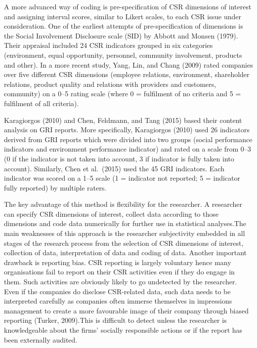 \documentclass[
]{mitthesis}
\begin{document}
A more advanced way of coding is pre-specification of CSR dimensions of interest and assigning interval scores, similar to Likert scales, to each CSR issue under consideration. One of the earliest attempts of pre-specification of dimensions is the Social Involvement Disclosure scale (SID) by Abbott and Monsen (1979). Their appraisal included 24 CSR indicators grouped in six categories (environment, equal opportunity, personnel, community involvement, products and other). In a more recent study, Yang, Lin, and Chang (2009) rated companies over five different CSR dimensions (employee relations, environment, shareholder relations, product quality and relations with providers and customers, community) on a 0--5 rating scale (where 0 = fulfilment of no criteria and 5 = fulfilment of all criteria).

Karagiorgos (2010) and Chen, Feldmann, and Tang (2015) based their content analysis on GRI reports. More specifically, Karagiorgos (2010) used 26 indicators derived from GRI reports which were divided into two groups (social performance indicators and environment performance indicator) and rated on a scale from 0--3 (0 if the indicator is not taken into account, 3 if indicator is fully taken into account). Similarly, Chen et al.~(2015) used the 45 GRI indicators. Each indicator was scored on a 1--5 scale (1 = indicator not reported; 5 = indicator fully reported) by multiple raters.

The key advantage of this method is flexibility for the researcher. A researcher can specify CSR dimensions of interest, collect data according to those dimensions and code data numerically for further use in statistical analyses.The main weaknesses of this approach is the researcher subjectivity embedded in all stages of the research process from the selection of CSR dimensions of interest, collection of data, interpretation of data and coding of data. Another important drawback is reporting bias. CSR reporting is largely voluntary hence many organisations fail to report on their CSR activities even if they do engage in them. Such activities are obviously likely to go undetected by the researcher. Even if the companies do disclose CSR-related data, such data needs to be interpreted carefully as companies often immerse themselves in impressions management to create a more favourable image of their company through biased reporting (Turker, 2009).This is difficult to detect unless the researcher is knowledgeable about the firms' socially responsible actions or if the report has been externally audited.
\end{document}

